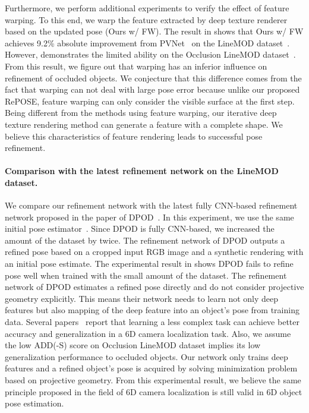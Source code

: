 \documentclass[10pt,twocolumn,letterpaper]{article}
\begin{document}
Furthermore, we perform additional experiments to verify the effect of feature warping.
To this end, we warp the feature extracted by deep texture renderer based on the updated pose (Ours w/ FW).
The result in  shows that Ours w/ FW achieves 9.2\% absolute improvement from PVNet~\cite{peng2019pvnet} on the LineMOD dataset~\cite{linemod}.
However,  demonstrates the limited ability on the Occlusion LineMOD dataset~\cite{10.1007/978-3-319-10605-2_35}.
From this result, we figure out that warping has an inferior influence on refinement of occluded objects.
We conjecture that this difference comes from the fact that warping can not deal with large pose error because unlike our proposed RePOSE, feature warping can only consider the visible surface at the first step.
Being different from the methods using feature warping, our iterative deep texture rendering method can generate a feature with a complete shape.
We believe this characteristics of feature rendering leads to successful pose refinement.

\paragraph{Comparison with the latest refinement network on the LineMOD dataset.}
We compare our refinement network with the latest fully CNN-based refinement network proposed in the paper of DPOD~\cite{Zakharov_2019_ICCV}.
In this experiment, we use the same initial pose estimator~\cite{peng2019pvnet}.
Since DPOD is fully CNN-based, we increased the amount of the dataset by twice.
The refinement network of DPOD outputs a refined pose based on a cropped input RGB image and a synthetic rendering with an initial pose estimate.
The experimental result in  shows DPOD fails to refine pose well when trained with the small amount of the dataset.
The refinement network of DPOD estimates a refined pose directly and do not consider projective geometry explicitly.
This means their network needs to learn not only deep features but also mapping of the deep feature into an object's pose from training data.
Several papers~\cite{brachmann2016differentiable,Sattler_2019_CVPR,Brachmann_2018_CVPR,Sattler2017EfficientE} report that learning a less complex task can achieve better accuracy and generalization in a 6D camera localization task.
Also, we assume the low ADD(-S) score on Occlusion LineMOD dataset implies its low generalization performance to occluded objects.
Our network only trains deep features and a refined object's pose is acquired by solving minimization problem based on projective geometry.
From this experimental result, we believe the same principle proposed in the field of 6D camera localization is still valid in 6D object pose estimation.
\end{document}

